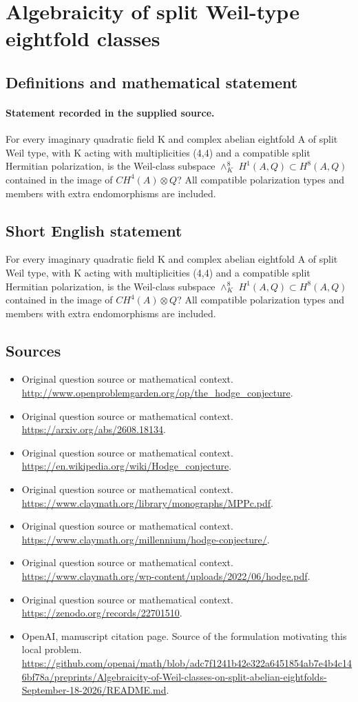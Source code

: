 \documentclass[11pt]{article}
\begin{document}
\section*{Algebraicity of split Weil-type eightfold classes}\label{30007008}
\subsection{Definitions and mathematical statement}
\paragraph{Statement recorded in the supplied source.}
For every imaginary quadratic field K and complex abelian eightfold A of split Weil type, with K acting with multiplicities (4,4) and a compatible split Hermitian polarization, is the Weil-class subspace $\wedge ^{8}_K$ $H^{1}(A,Q)\subset H^{8}(A,Q)$ contained in the image of $CH^{4}(A)\otimes Q$? All compatible polarization types and members with extra endomorphisms are included.
\subsection{Short English statement}
For every imaginary quadratic field K and complex abelian eightfold A of split Weil type, with K acting with multiplicities (4,4) and a compatible split Hermitian polarization, is the Weil-class subspace $\wedge ^{8}_K$ $H^{1}(A,Q)\subset H^{8}(A,Q)$ contained in the image of $CH^{4}(A)\otimes Q$? All compatible polarization types and members with extra endomorphisms are included.
\subsection{Sources}
\begin{itemize}
\item[S1] Original question source or mathematical context.
\url{http://www.openproblemgarden.org/op/the_hodge_conjecture}.
\item[S2] Original question source or mathematical context.
\url{https://arxiv.org/abs/2608.18134}.
\item[S3] Original question source or mathematical context.
\url{https://en.wikipedia.org/wiki/Hodge_conjecture}.
\item[S4] Original question source or mathematical context.
\url{https://www.claymath.org/library/monographs/MPPc.pdf}.
\item[S5] Original question source or mathematical context.
\url{https://www.claymath.org/millennium/hodge-conjecture/}.
\item[S6] Original question source or mathematical context.
\url{https://www.claymath.org/wp-content/uploads/2022/06/hodge.pdf}.
\item[S7] Original question source or mathematical context.
\url{https://zenodo.org/records/22701510}.
\item[S8] OpenAI, manuscript citation page. Source of the formulation motivating this local problem.
\url{https://github.com/openai/math/blob/adc7f1241b42e322a6451854ab7e4b4c146bf78a/preprints/Algebraicity-of-Weil-classes-on-split-abelian-eightfolds-September-18-2026/README.md}.
\end{itemize}
\end{document}
